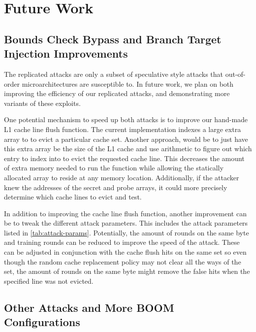 \section{Future Work}

\subsection{Bounds Check Bypass and Branch Target Injection Improvements}

The replicated attacks are only a subset of speculative style attacks that out-of-order
microarchitectures are susceptible to. In future work, we plan on both improving the efficiency of
our replicated attacks, and demonstrating more variants of these exploits.

One potential mechanism to speed up both attacks is to improve our hand-made L1 cache line flush
function. The current implementation indexes a large extra array to to evict a particular cache set.
Another approach, would be to just have this extra array be the size of the L1 cache and use
arithmetic to figure out which entry to index into to evict the requested cache line.
This decreases the amount of extra memory needed to run the function while allowing the statically
allocated array to reside at any memory location. Additionally, if the attacker knew the addresses of
the secret and probe arrays, it could more precisely determine which cache lines to evict and test.

In addition to improving the cache line flush function, another
improvement can be to tweak the different attack parameters. This includes
the attack parameters listed in \ref{tab:attack-params}. Potentially, the amount of rounds on the
same byte and training rounds can be reduced to improve the speed of the attack.
These can be adjusted in conjunction with the cache flush hits on the same set so even though the 
random cache replacement policy may not clear all the ways of the set, the amount of rounds on
the same byte might remove the false hits when the specified line was not evicted.

\subsection{Other Attacks and More BOOM Configurations}

